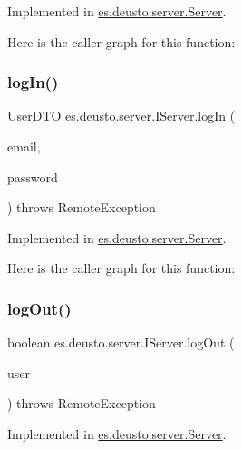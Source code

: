 Implemented in \mbox{\hyperlink{classes_1_1deusto_1_1server_1_1_server_ad742fe9a45edccd8b2309be98a74baae}{es.\+deusto.\+server.\+Server}}.

Here is the caller graph for this function\+:
\mbox{\label{interfacees_1_1deusto_1_1server_1_1_i_server_a62db155ac744b9712e303ceea76a3560}} 
\subsubsection{\texorpdfstring{logIn()}{logIn()}}
{\footnotesize\ttfamily \mbox{\hyperlink{classes_1_1deusto_1_1server_1_1data_1_1_user_d_t_o}{User\+D\+TO}} es.\+deusto.\+server.\+I\+Server.\+log\+In (\begin{DoxyParamCaption}\item[{String}]{email,  }\item[{String}]{password }\end{DoxyParamCaption}) throws Remote\+Exception}



Implemented in \mbox{\hyperlink{classes_1_1deusto_1_1server_1_1_server_ab93f5cc9b5825192c31cd2088014378d}{es.\+deusto.\+server.\+Server}}.

Here is the caller graph for this function\+:
\mbox{\label{interfacees_1_1deusto_1_1server_1_1_i_server_a479231082cae13f9c651c0ec2cb2cece}} 
\subsubsection{\texorpdfstring{logOut()}{logOut()}}
{\footnotesize\ttfamily boolean es.\+deusto.\+server.\+I\+Server.\+log\+Out (\begin{DoxyParamCaption}\item[{\mbox{\hyperlink{classes_1_1deusto_1_1server_1_1data_1_1_user_d_t_o}{User\+D\+TO}}}]{user }\end{DoxyParamCaption}) throws Remote\+Exception}



Implemented in \mbox{\hyperlink{classes_1_1deusto_1_1server_1_1_server_a92cf8a599adfa6a34f7cfe788119cf0a}{es.\+deusto.\+server.\+Server}}.


